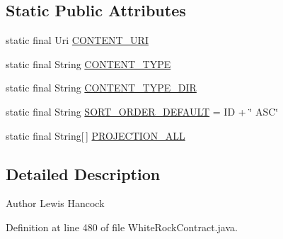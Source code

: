\subsection*{Static Public Attributes}
\begin{DoxyCompactItemize}
\item 
static final Uri \hyperlink{classuk_1_1ac_1_1swan_1_1digitaltrails_1_1database_1_1_white_rock_contract_1_1_waypoint_with_english_description_with_media_ad64a59e3c9fca4bc703fc7e865e253ec}{C\+O\+N\+T\+E\+N\+T\+\_\+\+U\+R\+I}
\item 
static final String \hyperlink{classuk_1_1ac_1_1swan_1_1digitaltrails_1_1database_1_1_white_rock_contract_1_1_waypoint_with_english_description_with_media_a42b173cb35f7a42233dde2e566b70c2b}{C\+O\+N\+T\+E\+N\+T\+\_\+\+T\+Y\+P\+E}
\item 
static final String \hyperlink{classuk_1_1ac_1_1swan_1_1digitaltrails_1_1database_1_1_white_rock_contract_1_1_waypoint_with_english_description_with_media_a5db7510f469f295f6dd76a8f64521cca}{C\+O\+N\+T\+E\+N\+T\+\_\+\+T\+Y\+P\+E\+\_\+\+D\+I\+R}
\item 
static final String \hyperlink{classuk_1_1ac_1_1swan_1_1digitaltrails_1_1database_1_1_white_rock_contract_1_1_waypoint_with_english_description_with_media_af53e4a3e11149e792e4e3810be38e574}{S\+O\+R\+T\+\_\+\+O\+R\+D\+E\+R\+\_\+\+D\+E\+F\+A\+U\+L\+T} = I\+D + \char`\"{} A\+S\+C\char`\"{}
\item 
static final String\mbox{[}$\,$\mbox{]} \hyperlink{classuk_1_1ac_1_1swan_1_1digitaltrails_1_1database_1_1_white_rock_contract_1_1_waypoint_with_english_description_with_media_a0d0c6a1b9cfafec45bf300d91ecd6c5e}{P\+R\+O\+J\+E\+C\+T\+I\+O\+N\+\_\+\+A\+L\+L}
\end{DoxyCompactItemize}


\subsection{Detailed Description}
\begin{DoxyAuthor}{Author}
Lewis Hancock 
\end{DoxyAuthor}


Definition at line 480 of file White\+Rock\+Contract.\+java.




